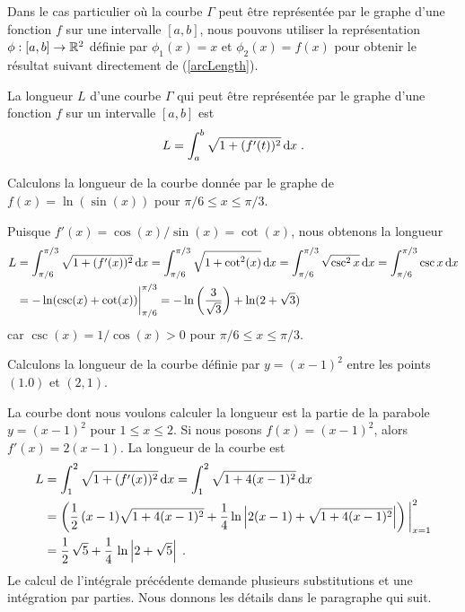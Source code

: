{Dans le cas particulier où la courbe $\Gamma$ peut être représentée
par le graphe d'une fonction $f$ sur une intervalle $[a,b]$, nous pouvons
utiliser la représentation $\phi:[a,b]\rightarrow \mathbb{R}^2$ définie par
$\phi_1(x)=x$ et $\phi_2(x) = f(x)$ pour obtenir le résultat suivant
directement de (\ref{arcLength}).

\begin{prop}
La longueur $L$ d'une courbe $\Gamma$ qui peut être représentée par le
graphe d'une fonction $f$ sur un intervalle $[a,b]$ est
\begin{equation}\label{arcLength2}
L = \int_a^b \sqrt{ 1 + (f'(t))^2} \,\mathrm{d}x \; .
\end{equation}
\end{prop}

\begin{egg}
Calculons la longueur de la courbe donnée par le graphe de
$f(x) = \ln(\sin(x))$ pour $\pi/6 \leq x \leq \pi/3$.

Puisque $f'(x) = \cos(x)/\sin(x)  = \cot(x)$, nous obtenons la longueur
\begin{align*}
L&= \int_{\pi/6}^{\pi/3} \sqrt{ 1 + (f'(x))^2}\,\mathrm{d}x
= \int_{\pi/6}^{\pi/3} \sqrt{ 1 + \cot^2(x)}\,\mathrm{d}x
= \int_{\pi/6}^{\pi/3} \sqrt{ \csc^2{x} }\,\mathrm{d}x
= \int_{\pi/6}^{\pi/3} \csc{x}\,\mathrm{d}x \\
&= - \ln(\csc(x)+\cot(x)) \bigg|_{\pi/6}^{\pi/3}
= -\ln\left(\frac{3}{\sqrt{3}}\right) + \ln(2+\sqrt{3})
\end{align*}
car $\csc(x) = 1/\cos(x) >0$ pour $\pi/6 \leq x \leq \pi/3$.
\end{egg}

\begin{egg}
Calculons la longueur de la courbe définie par $y = (x-1)^2$ entre les
points $(1.0)$ et $(2,1)$.

La courbe dont nous voulons calculer la longueur est la partie de la
parabole $y= (x-1)^2$ pour $1\leq x \leq 2$.  Si nous posons
$f(x) = (x-1)^2$, alors $f'(x) = 2(x-1)$.  La longueur de la courbe est
\begin{align*}
L &= \int_1^2 \sqrt{1+(f'(x))^2} \,\mathrm{d}x
= \int_1^2 \sqrt{1+4(x-1)^2} \,\mathrm{d}x \\
&= \left( \frac{1}{2}\,(x-1)\sqrt{1+4(x-1)^2} + \frac{1}{4}
\ln\left| 2(x-1) + \sqrt{1+4(x-1)^2} \right| \right)\bigg|_{x=1}^2 \\
&= \frac{1}{2}\, \sqrt{5} + \frac{1}{4}\, \ln\left| 2 + \sqrt{5}\right| \; .
\end{align*}
Le calcul de l'intégrale précédente demande plusieurs substitutions et
une intégration par parties.  Nous donnons les détails dans le
paragraphe qui suit.


\end{egg}}

